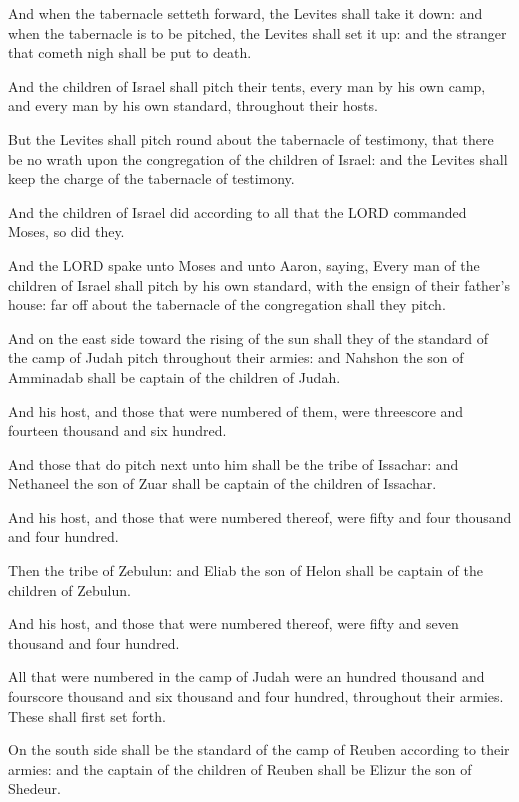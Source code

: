 \Verse And when the tabernacle setteth forward, the Levites shall take
it down: and when the tabernacle is to be pitched, the Levites shall
set it up: and the stranger that cometh nigh shall be put to death.

\Verse And the children of Israel shall pitch their tents, every man by
his own camp, and every man by his own standard, throughout their
hosts.

\Verse But the Levites shall pitch round about the tabernacle of
testimony, that there be no wrath upon the congregation of the
children of Israel: and the Levites shall keep the charge of the
tabernacle of testimony.

\Verse And the children of Israel did according to all that the LORD
commanded Moses, so did they.


\Chapter
\Verse And the LORD spake unto Moses and unto Aaron, saying, \Verse Every
man of the children of Israel shall pitch by his own standard, with
the ensign of their father's house: far off about the tabernacle of
the congregation shall they pitch.

\Verse And on the east side toward the rising of the sun shall they of
the standard of the camp of Judah pitch throughout their armies: and
Nahshon the son of Amminadab shall be captain of the children of
Judah.

\Verse And his host, and those that were numbered of them, were
threescore and fourteen thousand and six hundred.

\Verse And those that do pitch next unto him shall be the tribe of
Issachar: and Nethaneel the son of Zuar shall be captain of the
children of Issachar.

\Verse And his host, and those that were numbered thereof, were fifty and
four thousand and four hundred.

\Verse Then the tribe of Zebulun: and Eliab the son of Helon shall be
captain of the children of Zebulun.

\Verse And his host, and those that were numbered thereof, were fifty and
seven thousand and four hundred.

\Verse All that were numbered in the camp of Judah were an hundred
thousand and fourscore thousand and six thousand and four hundred,
throughout their armies. These shall first set forth.

\Verse On the south side shall be the standard of the camp of Reuben
according to their armies: and the captain of the children of Reuben
shall be Elizur the son of Shedeur.

